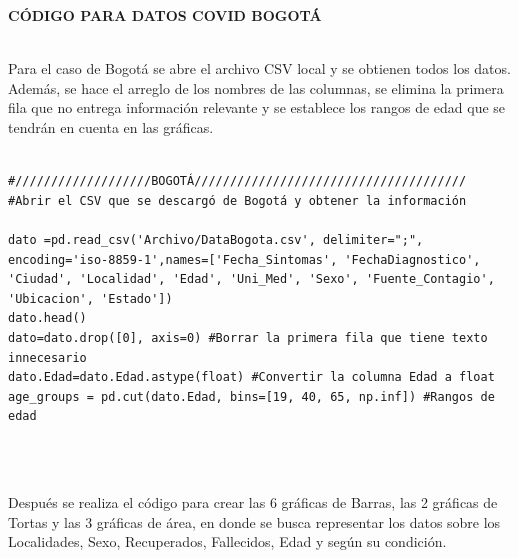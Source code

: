 \documentclass[conference,compsoc,onecolumn]{IEEEtran}
\begin{document}
\textbf{CÓDIGO PARA DATOS COVID BOGOTÁ}
\\\

Para el caso de Bogotá  se abre el archivo CSV local y se obtienen todos los datos. Además, se hace el arreglo de los nombres de las columnas, se elimina la primera fila que no entrega información relevante y se establece los rangos de edad que se tendrán en cuenta en las gráficas.
\\\

\begin{lstlisting}
#///////////////////BOGOTÁ//////////////////////////////////////
#Abrir el CSV que se descargó de Bogotá y obtener la información

dato =pd.read_csv('Archivo/DataBogota.csv', delimiter=";", encoding='iso-8859-1',names=['Fecha_Sintomas', 'FechaDiagnostico', 'Ciudad', 'Localidad', 'Edad', 'Uni_Med', 'Sexo', 'Fuente_Contagio', 'Ubicacion', 'Estado'])
dato.head()
dato=dato.drop([0], axis=0) #Borrar la primera fila que tiene texto innecesario
dato.Edad=dato.Edad.astype(float) #Convertir la columna Edad a float
age_groups = pd.cut(dato.Edad, bins=[19, 40, 65, np.inf]) #Rangos de edad
\end{lstlisting}
\\\

Después se realiza el código para crear las 6 gráficas de Barras, las 2 gráficas de Tortas y las 3 gráficas de área, en donde se busca representar los datos sobre los Localidades, Sexo, Recuperados, Fallecidos, Edad y según su condición.
\\\
\end{document}
